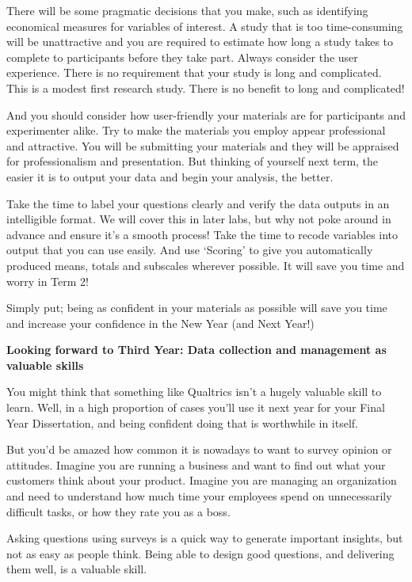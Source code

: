 \documentclass[
  letterpaper,
  DIV=11,
  numbers=noendperiod]{scrartcl}
\begin{document}
There will be some pragmatic decisions that you make, such as
identifying economical measures for variables of interest. A study that
is too time-consuming will be unattractive and you are required to
estimate how long a study takes to complete to participants before they
take part. Always consider the user experience. There is no requirement
that your study is long and complicated. This is a modest first research
study. There is no benefit to long and complicated!

And you should consider how user-friendly your materials are for
participants and experimenter alike. Try to make the materials you
employ appear professional and attractive. You will be submitting your
materials and they will be appraised for professionalism and
presentation. But thinking of yourself next term, the easier it is to
output your data and begin your analysis, the better.

Take the time to label your questions clearly and verify the data
outputs in an intelligible format. We will cover this in later labs, but
why not poke around in advance and ensure it's a smooth process! Take
the time to recode variables into output that you can use easily. And
use `Scoring' to give you automatically produced means, totals and
subscales wherever possible. It will save you time and worry in Term 2!

Simply put; being as confident in your materials as possible will save
you time and increase your confidence in the New Year (and Next Year!)

\textbf{Looking forward to Third Year: Data collection and management as
valuable skills}

You might think that something like Qualtrics isn't a hugely valuable
skill to learn. Well, in a high proportion of cases you'll use it next
year for your Final Year Dissertation, and being confident doing that is
worthwhile in itself.

But you'd be amazed how common it is nowadays to want to survey opinion
or attitudes. Imagine you are running a business and want to find out
what your customers think about your product. Imagine you are managing
an organization and need to understand how much time your employees
spend on unnecessarily difficult tasks, or how they rate you as a boss.

Asking questions using surveys is a quick way to generate important
insights, but not as easy as people think. Being able to design good
questions, and delivering them well, is a valuable skill.
\end{document}
